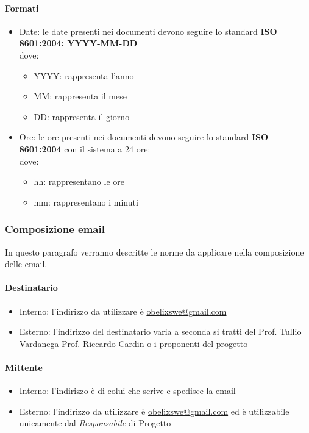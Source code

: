 \paragraph{ Formati }
\begin{itemize}
\item Date: le date presenti nei documenti devono seguire lo standard 
\textbf{ISO 8601:2004:  YYYY-MM-DD}\\
  dove:
  \begin{itemize}
  \item YYYY: rappresenta l’anno
  \item MM: rappresenta il mese
  \item DD: rappresenta il giorno
  \end{itemize}

\item Ore: le ore presenti nei documenti devono seguire lo standard 
\textbf{ISO 8601:2004} con il sistema a 24 ore:\\
  dove:
  \begin{itemize}
  \item hh: rappresentano le ore
  \item  mm: rappresentano i minuti
  \end{itemize}
\end{itemize}

\subsubsection{Composizione email}
In questo paragrafo verranno descritte le norme da applicare nella composizione delle email.

\paragraph{Destinatario}
\begin{itemize} 
\item Interno: l’indirizzo da utilizzare è \href{mailto:obelixswe@gmail.com}{obelixswe@gmail.com}
\item Esterno: l’indirizzo del destinatario varia a seconda si tratti del Prof. Tullio Vardanega
  Prof. Riccardo Cardin o i proponenti del progetto
\end{itemize}
\paragraph{Mittente}
\begin{itemize}
\item Interno: l’indirizzo è di colui che scrive e spedisce la email
\item Esterno: l’indirizzo da utilizzare è \href{mailto:obelixswe@gmail.com}{obelixswe@gmail.com} ed è utilizzabile unicamente dal  \emph{Responsabile}  di Progetto
\end{itemize}
